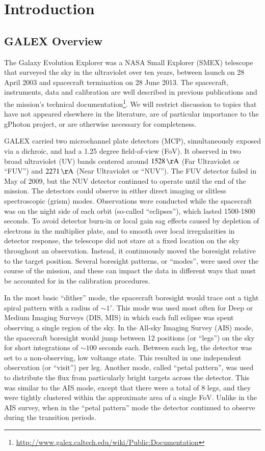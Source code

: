 \documentclass[5p]{elsarticle}
\begin{document}
\linenumbers

\section{Introduction}
\subsection{GALEX Overview}
The Galaxy Evolution Explorer \citep[GALEX;][]{mar2005} was a NASA Small Explorer (SMEX) telescope that surveyed the sky in the ultraviolet over ten years, between launch on 28 April 2003 and spacecraft termination on 28 June 2013. The spacecraft, instruments, data and calibration are well described in previous publications \citep{mor2005,mor2007} and the mission’s technical documentation\footnote{\url{http://www.galex.caltech.edu/wiki/Public:Documentation}}. We will restrict discussion to topics that have not appeared elsewhere in the literature, are of particular importance to the gPhoton project, or are otherwise necessary for completeness.

GALEX carried two microchannel plate detectors (MCP), simultaneously exposed via a dichroic, and had a 1.25 degree field-of-view (FoV).  It observed in two broad ultraviolet (UV) bands centered around $1528\,\rm{\AA}$ (Far Ultraviolet or ``FUV'') and $2271\,\rm{\AA}$ (Near Ultraviolet or ``NUV'').  The FUV detector failed in May of 2009, but the NUV detector continued to operate until the end of the mission. The detectors could observe in either direct imaging or slitless spectroscopic (grism) modes. Observations were conducted while the spacecraft was on the night side of each orbit (so-called ``eclipses''), which lasted 1500-1800 seconds. To avoid detector burn-in or local gain sag effects caused by depletion of electrons in the multiplier plate, and to smooth over local irregularities in detector response, the telescope did not stare at a fixed location on the sky throughout an observation.  Instead, it continuously moved the boresight relative to the target position. Several boresight patterns, or ``modes'', were used over the course of the mission, and these can impact the data in different ways that must be accounted for in the calibration procedures.

In the most basic ``dither'' mode, the spacecraft boresight would trace out a tight spiral pattern with a radius of $\sim 1'$.  This mode was used most often for Deep or Medium Imaging Surveys (DIS, MIS) in which each full eclipse was spent observing a single region of the sky. In the All-sky Imaging Survey (AIS) mode, the spacecraft boresight would jump between 12 positions (or ``legs'') on the sky for short integrations of $\sim 100$ seconds each.  Between each leg, the detector was set to a non-observing, low voltange state.  This resulted in one independent observation (or ``visit'') per leg.  Another mode, called ``petal pattern'', was used to distribute the flux from particularly bright targets across the detector.  This was similar to the AIS mode, except that there were a total of 8 legs, and they were tightly clustered within the approximate area of a single FoV.  Unlike in the AIS survey, when in the ``petal pattern'' mode the detector continued to observe during the transition periods.
\end{document}
